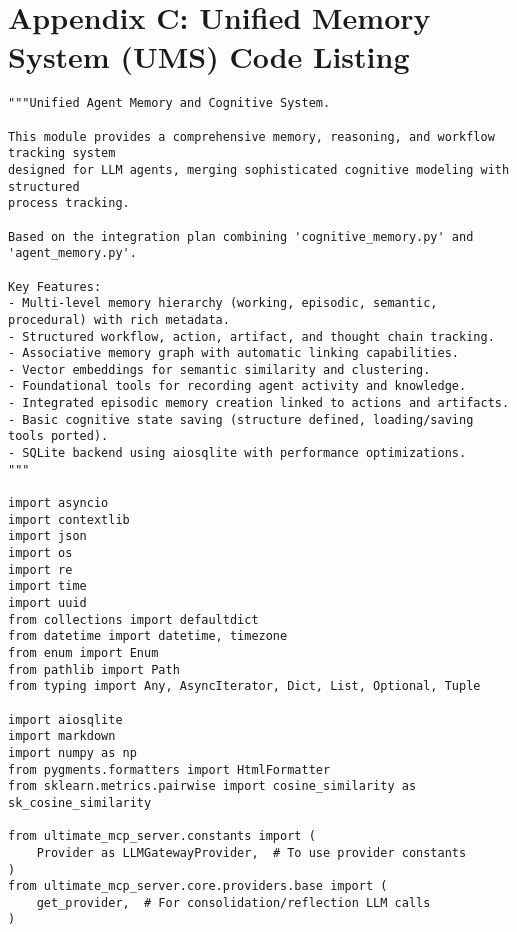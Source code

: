 \documentclass[12pt,a4paper]{article}
\begin{document}


\section{Appendix C: Unified Memory System (UMS) Code Listing}


\label{lst:ums-code}

\begin{pageablecode}
\begin{verbatim}
"""Unified Agent Memory and Cognitive System.

This module provides a comprehensive memory, reasoning, and workflow tracking system
designed for LLM agents, merging sophisticated cognitive modeling with structured
process tracking.

Based on the integration plan combining 'cognitive_memory.py' and 'agent_memory.py'.

Key Features:
- Multi-level memory hierarchy (working, episodic, semantic, procedural) with rich metadata.
- Structured workflow, action, artifact, and thought chain tracking.
- Associative memory graph with automatic linking capabilities.
- Vector embeddings for semantic similarity and clustering.
- Foundational tools for recording agent activity and knowledge.
- Integrated episodic memory creation linked to actions and artifacts.
- Basic cognitive state saving (structure defined, loading/saving tools ported).
- SQLite backend using aiosqlite with performance optimizations.
"""

import asyncio
import contextlib
import json
import os
import re
import time
import uuid
from collections import defaultdict
from datetime import datetime, timezone
from enum import Enum
from pathlib import Path
from typing import Any, AsyncIterator, Dict, List, Optional, Tuple

import aiosqlite
import markdown
import numpy as np
from pygments.formatters import HtmlFormatter
from sklearn.metrics.pairwise import cosine_similarity as sk_cosine_similarity

from ultimate_mcp_server.constants import (
    Provider as LLMGatewayProvider,  # To use provider constants
)
from ultimate_mcp_server.core.providers.base import (
    get_provider,  # For consolidation/reflection LLM calls
)


\end{verbatim}
\end{pageablecode}
\end{document}

